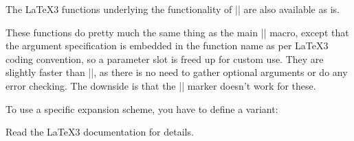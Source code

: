 \documentclass[a4paper]{withargs-packagedoc}
\begin{document}
The \LaTeX3 functions underlying the functionality of |\withargs| are
also available as is.


These functions do pretty much the same thing as the main |\withargs| macro,
except that the argument specification is embedded in the function name
as per \LaTeX3 coding convention, so a parameter slot is freed up for
custom use. They are slightly faster than |\withargs|, as there is no
need to gather optional arguments or do any error checking.
The downside is that the |\uniquecsname| marker doesn't work for these.

To use a specific expansion scheme, you have to define a variant:


Read the \LaTeX3 documentation for details.



\end{document}
